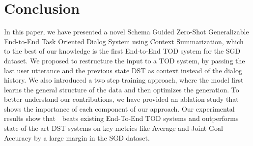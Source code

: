 
\section{Conclusion}

In this paper, we have presented a novel Schema Guided Zero-Shot Generalizable End-to-End Task Oriented Dialog System using Context Summarization,
which to the best of our knowledge is the first End-to-End TOD system for the SGD dataset. We proposed to restructure the input to a TOD system,
by passing the last user utterance and the previous state DST as context instead of the dialog history. We also introduced a two step
training approach, where the model first learns the general structure of the data and then optimizes the generation.
To better understand our contributions, we have provided an ablation study that shows the importance of each component of our approach.
Our experimental results show that~\oursys~beats existing End-To-End TOD systems and outperforms state-of-the-art DST systems on key metrics
like Average and Joint Goal Accuracy by a large margin in the SGD dataset.


